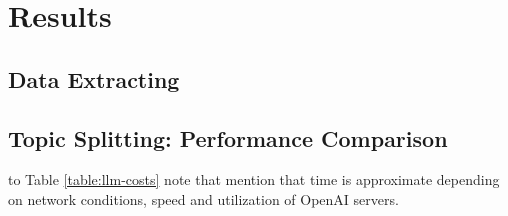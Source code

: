 \documentclass[]{interact}
\theoremstyle{plain}%
\theoremstyle{definition}
\theoremstyle{remark}
\begin{document}



\section{Results}




\subsection{Data Extracting}




\subsection{Topic Splitting: Performance Comparison}

to Table \ref{table:llm-costs} note that mention that time is approximate depending on network conditions, speed and utilization of OpenAI servers.

\begin{table}
\label{table:llm-costs}
\end{table}



\end{document}
